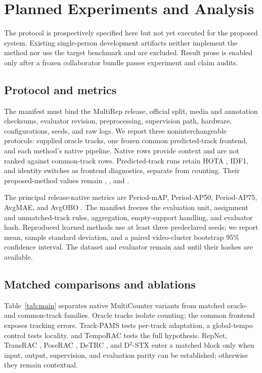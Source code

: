 \section{Planned Experiments and Analysis}
\label{sec:experiments}

The protocol is prospectively specified here but not yet executed for the proposed system.
Existing single-person development artifacts neither implement the method nor
use the target benchmark and are excluded. Result prose is enabled only after a
frozen collaborator bundle passes experiment and claim audits.

\subsection{Protocol and metrics}
The manifest must bind the MultiRep release, official split, media and annotation
checksums, evaluator revision, preprocessing, supervision path, hardware,
configurations, seeds, and raw logs. We report three noninterchangeable
protocols: supplied oracle tracks, one frozen common predicted-track frontend,
and each method's native pipeline. Native rows provide context and are not
ranked against common-track rows. Predicted-track runs retain HOTA
\cite{luiten2021hota}, IDF1, and identity switches \cite{ristani2016idmetrics}
as frontend diagnostics, separate from counting. Their proposed-method values
remain , , and .

The principal release-native metrics are Period-mAP, Period-AP50, Period-AP75,
AvgMAE, and AvgOBO \cite{tang2024multicounter,tang2026multicounterplus}. The
manifest freezes the evaluation unit, assignment and unmatched-track rules,
aggregation, empty-support handling, and evaluator hash. Reproduced learned
methods use at least three predeclared seeds; we report mean, sample standard
deviation, and a paired video-cluster bootstrap 95\% confidence interval. The
dataset and evaluator remain  and
 until their hashes are available.

\subsection{Matched comparisons and ablations}
Table~\ref{tab:main} separates native MultiCounter variants from matched oracle-
and common-track families. Oracle tracks isolate counting; the common frontend
exposes tracking errors. Track-PAMS tests per-track adaptation, a global-tempo
control tests locality, and TempoRAC tests the full hypothesis. RepNet,
TransRAC \cite{dwibedi2020repnet,hu2022transrac}, PoseRAC
\cite{yao2025poserac}, DeTRC \cite{ma2026detrc}, and D$^2$-STX
\cite{wang2026d2stx} enter a matched block only when input, output, supervision,
and evaluation parity can be established; otherwise they remain contextual.

